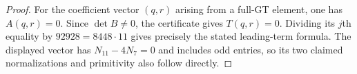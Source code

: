 \begin{proof}
For the coefficient vector $(q,r)$ arising from a full-GT element, one has
$A(q,r)=0$. Since $\det B\ne0$, the certificate gives
$T(q,r)=0$. Dividing its $j$th equality by $92928=8448\cdot11$
gives precisely the stated leading-term formula.
The displayed vector has $N_{11}-4N_7=0$ and includes odd
entries, so its two claimed normalizations and primitivity
also follow directly.
\end{proof}
